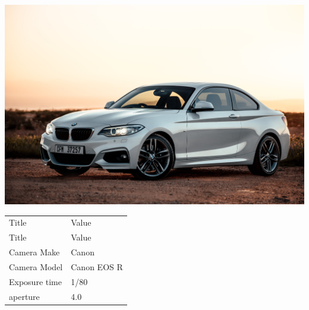 \documentclass[twocolumn]{article}
\begin{document}
\begin{center}
\includegraphics[width=0.7\columnwidth]{Image3}
\newline
\newline
\newline
\newline
\newline
\begin{tabular}{| m{3cm} | m{3cm} |}
\hline

Title  &  Value   \\

Title  &  Value   \\

\hline
Camera Make  & Canon   \\
\hline
Camera Model  & Canon EOS R   \\
\hline
Exposure time  & 1/80  \\
\hline
aperture & 4.0 \\
\hline


\end{tabular}


\end{center}

\pagebreak
\end{document}
